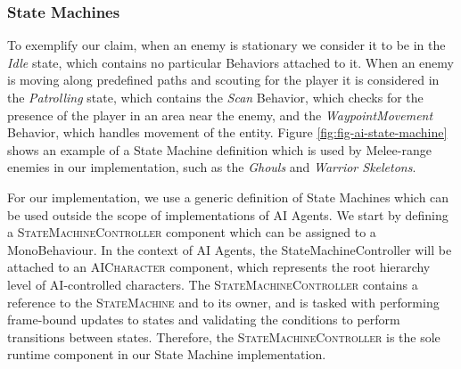 
\subsubsection{State Machines}

To exemplify our claim, when an enemy is stationary we consider it to be in the \emph{Idle} state, which contains no particular Behaviors attached to it. When an enemy is moving along predefined paths and scouting for the player it is considered in the \emph{Patrolling} state, which contains the \emph{Scan} Behavior, which checks for the presence of the player in an area near the enemy, and the \emph{WaypointMovement} Behavior, which handles movement of the entity. Figure \ref{fig:fig-ai-state-machine} shows an example of a State Machine definition which is used by Melee-range enemies in our implementation, such as the \emph{Ghouls} and \emph{Warrior Skeletons}.



For our implementation, we use a generic definition of State Machines which can be used outside the scope of implementations of AI Agents. We start by defining a \textsc{StateMachineController} component which can be assigned to a MonoBehaviour. In the context of AI Agents, the StateMachineController will be attached to an \textsc{AICharacter} component, which represents the root hierarchy level of AI-controlled characters. The \textsc{StateMachineController} contains a reference to the \textsc{StateMachine} and to its owner, and is tasked with performing frame-bound updates to states and validating the conditions to perform transitions between states. Therefore, the \textsc{StateMachineController} is the sole runtime component in our State Machine implementation.

